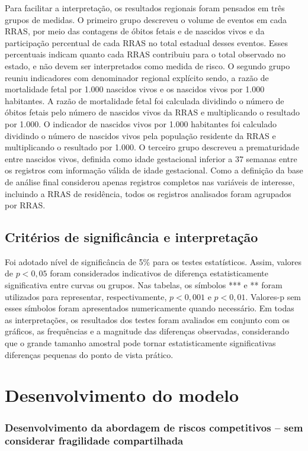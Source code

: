 Para facilitar a interpretação, os resultados regionais foram pensados em três 
grupos de medidas. O primeiro grupo descreveu o volume de eventos em cada RRAS, 
por meio das contagens de óbitos fetais e de nascidos vivos e da participação 
percentual de cada RRAS no total estadual desses eventos. Esses percentuais 
indicam quanto cada RRAS contribuiu para o total observado no estado, e não devem 
ser interpretados como medida de risco. O segundo grupo reuniu indicadores com 
denominador regional explícito sendo, a razão de mortalidade fetal por 1.000 nascidos 
vivos e os nascidos vivos por 1.000 habitantes. A razão de mortalidade fetal foi 
calculada dividindo o número de óbitos fetais pelo número de nascidos vivos da 
RRAS e multiplicando o resultado por 1.000. O indicador de nascidos vivos por 
1.000 habitantes foi calculado dividindo o número de nascidos vivos pela 
população residente da RRAS e multiplicando o resultado por 1.000. O terceiro 
grupo descreveu a prematuridade entre nascidos vivos, definida como idade 
gestacional inferior a 37 semanas entre os registros com informação válida de 
idade gestacional. Como a definição da base de análise final considerou apenas 
registros completos nas variáveis de interesse, incluindo a RRAS de residência, 
todos os registros analisados foram agrupados por RRAS.

\subsection{Critérios de significância e interpretação}

Foi adotado nível de significância de 5\% para os testes estatísticos. Assim,
valores de $p<0{,}05$ foram considerados indicativos de diferença estatisticamente 
significativa entre curvas ou grupos. Nas tabelas, os símbolos *** e ** foram 
utilizados para representar, respectivamente, $p<0{,}001$ e $p<0{,}01$. Valores-p 
sem esses símbolos foram apresentados numericamente quando necessário. Em todas as 
interpretações, os resultados dos testes foram avaliados em conjunto com os gráficos, 
as frequências e a magnitude das diferenças observadas, considerando que o grande 
tamanho amostral pode tornar estatisticamente significativas diferenças pequenas 
do ponto de vista prático.

\section{Desenvolvimento do modelo}

\subsubsection*{Desenvolvimento da abordagem de riscos competitivos -- sem
considerar fragilidade compartilhada}

